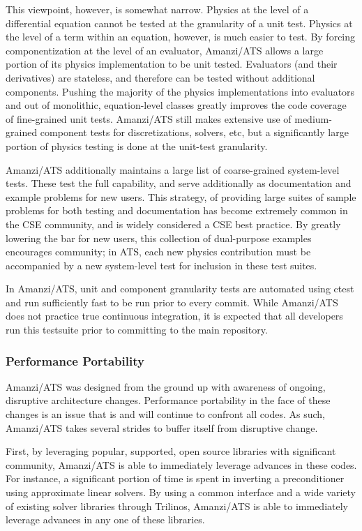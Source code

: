 This viewpoint, however, is somewhat narrow.
Physics at the level of a differential equation cannot be tested at the granularity of a unit test.
Physics at the level of a term within an equation, however, is much easier to test.
By forcing componentization at the level of an evaluator, Amanzi/ATS allows a large portion of its physics implementation to be unit tested.
Evaluators (and their derivatives) are stateless, and therefore can be tested without additional components.
Pushing the majority of the physics implementations into evaluators and out of monolithic, equation-level classes greatly improves the code coverage of fine-grained unit tests.
Amanzi/ATS still makes extensive use of medium-grained component tests for discretizations, solvers, etc, but a significantly large portion of physics testing is done at the unit-test granularity.

Amanzi/ATS additionally maintains a large list of coarse-grained system-level tests.
These test the full capability, and serve additionally as documentation and example problems for new users.
This strategy, of providing large suites of sample problems for both testing and documentation has become extremely common in the CSE community, and is widely considered a CSE best practice.
By greatly lowering the bar for new users, this collection of dual-purpose examples encourages community; in ATS, each new physics contribution must be accompanied by a new system-level test for inclusion in these test suites.

In Amanzi/ATS, unit and component granularity tests are automated using ctest and run sufficiently fast to be run prior to every commit.
While Amanzi/ATS does not practice true continuous integration, it is expected that all developers run this testsuite prior to committing to the main repository.


\subsubsection{Performance Portability}
\label{sec:amanzi:performance}
%
Amanzi/ATS was designed from the ground up with awareness of ongoing, disruptive architecture changes.
Performance portability in the face of these changes is an issue that is and will continue to confront all codes.
As such, Amanzi/ATS takes several strides to buffer itself from disruptive change.

First, by leveraging popular, supported, open source libraries with significant community, Amanzi/ATS is able to immediately leverage advances in these codes.
For instance, a significant portion of time is spent in inverting a preconditioner using approximate linear solvers.
By using a common interface and a wide variety of existing solver libraries through Trilinos, Amanzi/ATS is able to immediately leverage advances in any one of these libraries.

